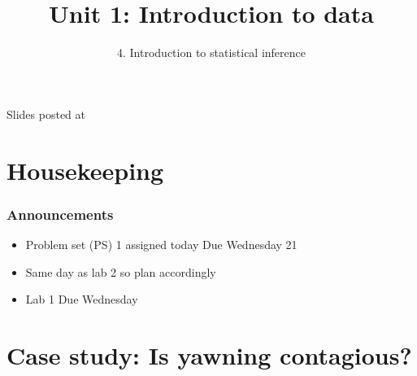\documentclass[slidestop,compress,mathserif,11pt,t,professionalfonts,xcolor=table]{beamer}
\title{Unit 1: Introduction to data}
\subtitle{4. Introduction to statistical inference}
\author{\CourseName}
\date{}
\institute{\InstituteName}
\begin{document}



\begin{frame}[plain]

\titlepage

\vfill

{\scriptsize {} \hfill Slides posted at  \webURL{\CourseSite}}

\addtocounter{framenumber}{-1} 

\end{frame}


\section{Housekeeping}


\begin{frame}
\frametitle{Announcements}

\begin{itemize}

\item Problem set (PS) 1 assigned today Due  Wednesday 21 

\item Same day as lab 2 so plan accordingly

\item Lab 1 Due Wednesday

\end{itemize}

\end{frame}


\section{Case study: Is yawning contagious?}

\end{document}
